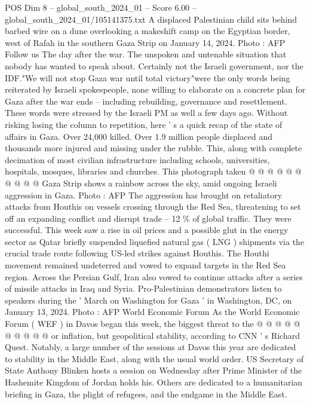 \begin{textsample}{POS Dim 8 – global\_south\_2024\_01 – Score 6.00 – global\_south\_2024\_01/105141375.txt}  \label{ex:f8_pos_282}
A displaced Palestinian child sits behind barbed wire on a dune overlooking a makeshift camp on the Egyptian border, west of Rafah in the southern Gaza Strip on January 14, 2024.
Photo : AFP Follow us The day after the war.
The unspoken and untenable situation that nobody has wanted to speak about.
Certainly not the Israeli government, nor the IDF."We will not stop Gaza war until total victory"were the only words being reiterated by Israeli spokespeople, none willing to elaborate on a concrete plan for Gaza after the war ends -- including rebuilding, governance and resettlement.
These words were stressed by the Israeli PM as well a few days ago.
Without risking losing the column to repetition, here ' s a quick recap of the state of affairs in Gaza.
Over 24,000 killed.
Over 1.9 million people displaced and thousands more injured and missing under the rubble.
This, along with complete decimation of most civilian infrastructure including schools, universities, hospitals, mosques, libraries and churches.
This photograph taken @ @ @ @ @ @ @ @ @ @ Gaza Strip shows a rainbow across the sky, amid ongoing Israeli aggression in Gaza.
Photo : AFP The aggression has brought on retaliatory attacks from Houthis on vessels crossing through the Red Sea, threatening to set off an expanding conflict and disrupt trade -- 12 \% of global traffic.
They were successful.
This week saw a rise in oil prices and a possible glut in the energy sector as Qatar briefly suspended liquefied natural gas ( LNG ) shipments via the crucial trade route following US-led strikes against Houthis.
The Houthi movement remained undeterred and vowed to expand targets in the Red Sea region.
Across the Persian Gulf, Iran also vowed to continue attacks after a series of missile attacks in Iraq and Syria.
Pro-Palestinian demonstrators listen to speakers during the ' March on Washington for Gaza ' in Washington, DC, on January 13, 2024.
Photo : AFP World Economic Forum As the World Economic Forum ( WEF ) in Davos began this week, the biggest threat to the @ @ @ @ @ @ @ @ @ @ or inflation, but geopolitical stability, according to CNN ' s Richard Quest.
Notably, a large number of the sessions at Davos this year are dedicated to stability in the Middle East, along with the usual world order.
US Secretary of State Anthony Blinken hosts a session on Wednesday after Prime Minister of the Hashemite Kingdom of Jordan holds his.
Others are dedicated to a humanitarian briefing in Gaza, the plight of refugees, and the endgame in the Middle East.

\end{textsample}
